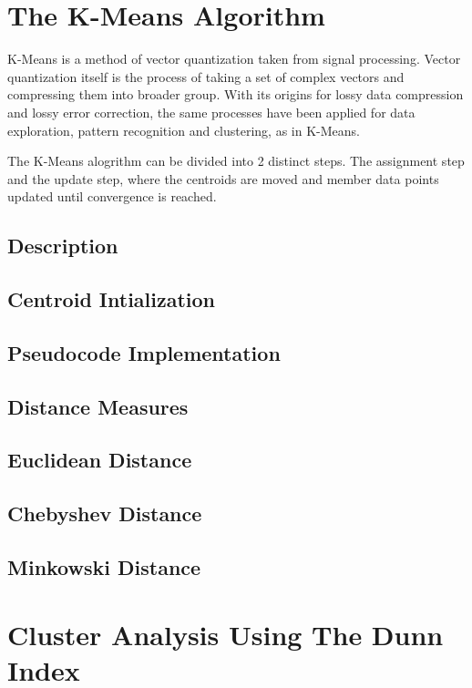 \documentclass[journal]{IEEEtran}
\begin{document}
\section{The K-Means Algorithm}
K-Means is a method of vector quantization taken from signal processing. Vector quantization itself is the process of taking a set of complex vectors and compressing them into broader group. With its origins for lossy data compression and lossy error correction, the same processes have been applied for data exploration, pattern recognition and clustering, as in K-Means.

The K-Means alogrithm can be divided into 2 distinct steps. The assignment step and the update step, where the centroids are moved and member data points updated until convergence is reached.

\subsection{Description}

\subsection{Centroid Intialization }

\subsection{Pseudocode Implementation}

\subsection{Distance Measures}

\subsection{Euclidean Distance}

\subsection{Chebyshev Distance}

\subsection{Minkowski Distance}
\section{Cluster Analysis Using The Dunn Index}
\end{document}
